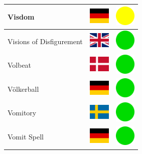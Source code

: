 \documentclass[12pt, a4paper, twoside]{report}
\begin{document}
\begin{center}
\begin{longtable}{|p{5cm}|p{2cm}|p{2cm}|}
Visdom & \includegraphics[width=1cm]{4x3/de} & \includegraphics[width=1cm]{likes/m} \\ \hline
Visions of Disfigurement & \includegraphics[width=1cm]{4x3/gb} & \includegraphics[width=1cm]{likes/y} \\ \hline
Volbeat & \includegraphics[width=1cm]{4x3/dk} & \includegraphics[width=1cm]{likes/y} \\ \hline
Völkerball & \includegraphics[width=1cm]{4x3/de} & \includegraphics[width=1cm]{likes/y} \\ \hline
Vomitory & \includegraphics[width=1cm]{4x3/se} & \includegraphics[width=1cm]{likes/y} \\ \hline
Vomit Spell & \includegraphics[width=1cm]{4x3/de} & \includegraphics[width=1cm]{likes/y} \\ \hline

\end{longtable}
\end{center}
\end{document}
